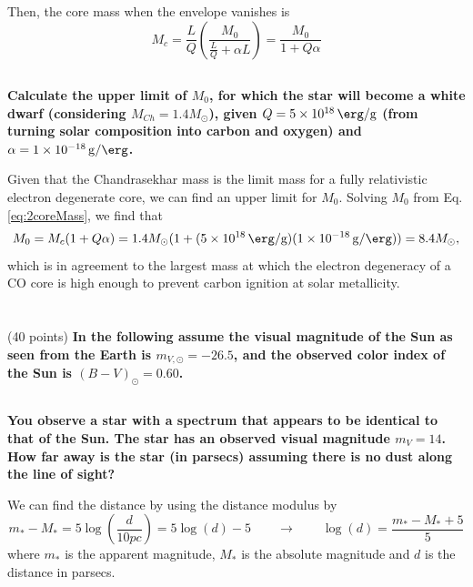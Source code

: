 Then, the core mass when the envelope vanishes is
\begin{equation}
    M_c = \frac{L}{Q}\left(\frac{M_0}{\frac{L}{Q} +\alpha L}\right) = \frac{M_0}{1+Q\alpha}
    \label{eq:2coreMass}
\end{equation}

\subsection{}
\textbf{Calculate the upper limit of $M_0$, for which the star will become a white dwarf (considering $M_{Ch} = 1.4M_\odot$), given $Q = \SI{5e18}{\erg\per\g}$ (from turning solar composition
into carbon and oxygen) and $\alpha = \SI{1e-18}{g\per\erg}$.}

Given that the Chandrasekhar mass is the limit mass for a fully relativistic electron degenerate core, we can find an upper limit for $M_0$. Solving $M_0$ from Eq. \ref{eq:2coreMass}, we find that
\begin{equation*}
    M_0 = M_c (1+Q\alpha) = 1.4M_\odot (1 + (\SI{5e18}{\erg\per\g})(\SI{1e-18}{g\per\erg}))= 8.4 M_\odot,
\end{equation*}
which is in agreement to the largest mass at which the electron degeneracy of a CO core is high enough to prevent carbon ignition at solar metallicity.




\section{}(40 points)
\textbf{In the following assume the visual magnitude of the Sun as seen from the Earth is $m_{V,\odot} = -26.5$, and the observed color index of the Sun is $(B-V)_\odot = 0.60$.}
\subsection{}
\textbf{You observe a star with a spectrum that appears to be identical to that of the Sun.
The star has an observed visual magnitude $m_V = 14$. How far away is the star (in parsecs) assuming there is no dust along the line of sight?}

We can find the distance by using the distance modulus by
\begin{equation*}
    m_*-M_* = 5\log\left(\frac{d}{10pc}\right)=5\log(d)-5 \qquad\rightarrow\qquad \log(d) = \frac{m_*-M_*+5}{5}
\end{equation*}
where $m_*$ is the apparent magnitude, $M_*$ is the absolute magnitude and $d$ is the distance in parsecs.

